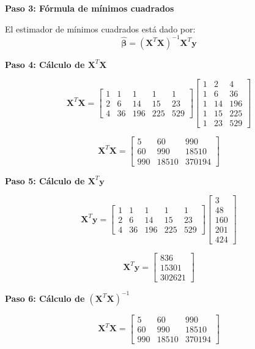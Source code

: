 \documentclass[11pt,a4paper]{article}
\begin{document}
\textbf{Paso 3: Fórmula de mínimos cuadrados}

El estimador de mínimos cuadrados está dado por:
\[
\hat{\boldsymbol{\beta}} = (\mathbf{X}^T\mathbf{X})^{-1}\mathbf{X}^T\mathbf{y}
\]

\textbf{Paso 4: Cálculo de $\mathbf{X}^T\mathbf{X}$}

\[
\mathbf{X}^T\mathbf{X} = \begin{bmatrix}
    1 & 1 & 1 & 1 & 1 \\
    2 & 6 & 14 & 15 & 23 \\
    4 & 36 & 196 & 225 & 529
\end{bmatrix}
\begin{bmatrix}
    1 & 2 & 4 \\
    1 & 6 & 36 \\
    1 & 14 & 196 \\
    1 & 15 & 225 \\
    1 & 23 & 529
\end{bmatrix}
\]

\[
\mathbf{X}^T\mathbf{X} = \begin{bmatrix}
5 & 60 & 990 \\
60 & 990 & 18510 \\
990 & 18510 & 370194
\end{bmatrix}
\]

\textbf{Paso 5: Cálculo de $\mathbf{X}^T\mathbf{y}$}

\[
\mathbf{X}^T\mathbf{y} = \begin{bmatrix}
    1 & 1 & 1 & 1 & 1 \\
    2 & 6 & 14 & 15 & 23 \\
    4 & 36 & 196 & 225 & 529
\end{bmatrix}
\begin{bmatrix}
    3 \\
    48 \\
    160 \\
    201 \\
    424
\end{bmatrix}
\]

\[
\mathbf{X}^T\mathbf{y} = \begin{bmatrix} 836 \\ 15301 \\ 302621 \end{bmatrix}
\]

\textbf{Paso 6: Cálculo de $(\mathbf{X}^T\mathbf{X})^{-1}$}

\[
\mathbf{X}^T\mathbf{X} = \begin{bmatrix} 5 & 60 & 990 \\ 60 & 990 & 18510 \\ 990 & 18510 & 370194 \end{bmatrix}
\]
\end{document}
